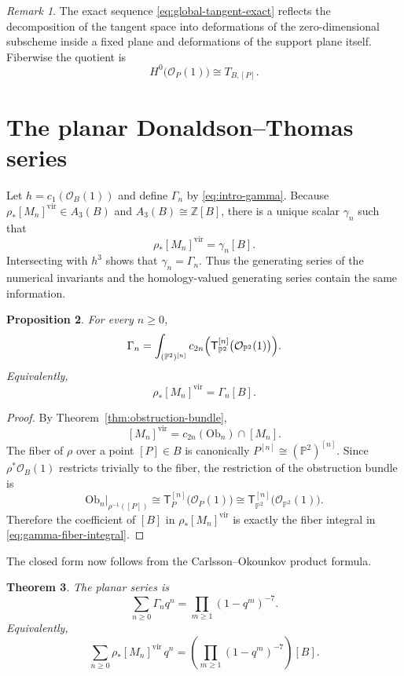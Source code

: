 \documentclass[12pt]{amsart}
\numberwithin{equation}{section}
\newcommand{\PP}{\mathbb{P}}
\newcommand{\Z}{\mathbb{Z}}
\newcommand{\OO}{\mathcal{O}}
\newcommand{\Ttw}{\mathsf{T}}
\newcommand{\vfc}[1]{[#1]^{\mathrm{vir}}}
\theoremstyle{plain}
\newtheorem{theorem}{Theorem}[section]
\newtheorem{proposition}[theorem]{Proposition}
\theoremstyle{definition}
\theoremstyle{remark}
\newtheorem{remark}[theorem]{Remark}
\begin{document}
\begin{remark}\label{rem:tbundle}
The exact sequence \eqref{eq:global-tangent-exact} reflects the decomposition of the tangent space into deformations of the zero-dimensional subscheme inside a fixed plane and deformations of the support plane itself.
Fiberwise the quotient is
\[
H^0\bigl(\OO_P(1)\bigr)\cong T_{B,[P]}.
\]
\end{remark}

\section{The planar Donaldson--Thomas series}\label{sec:series}

Let $h=c_1(\OO_B(1))$ and define $\Gamma_n$ by \eqref{eq:intro-gamma}.
Because $\rho_*\vfc{M_n}\in A_3(B)$ and $A_3(B)\cong \Z[B]$, there is a unique scalar $\gamma_n$ such that
\[
\rho_*\vfc{M_n}=\gamma_n[B].
\]
Intersecting with $h^3$ shows that $\gamma_n=\Gamma_n$.
Thus the generating series of the numerical invariants and the homology-valued generating series contain the same information.

\begin{proposition}\label{prop:fiber-integral}
For every $n\ge 0$,
\begin{equation}\label{eq:gamma-fiber-integral}
\Gamma_n=\int_{(\PP^2)^{[n]}} c_{2n}\Bigl(\Ttw_{\PP^2}^{[n]}\bigl(\OO_{\PP^2}(1)\bigr)\Bigr).
\end{equation}
Equivalently,
\[
\rho_*\vfc{M_n}=\Gamma_n[B].
\]
\end{proposition}

\begin{proof}
By Theorem~\ref{thm:obstruction-bundle},
\[
\vfc{M_n}=c_{2n}(\mathrm{Ob}_n)\cap [M_n].
\]
The fiber of $\rho$ over a point $[P]\in B$ is canonically $P^{[n]}\cong (\PP^2)^{[n]}$.
Since $\rho^*\OO_B(1)$ restricts trivially to the fiber, the restriction of the obstruction bundle is
\[
\mathrm{Ob}_n|_{\rho^{-1}([P])}
\cong
\Ttw_{P}^{[n]}\bigl(\OO_P(1)\bigr)
\cong
\Ttw_{\PP^2}^{[n]}\bigl(\OO_{\PP^2}(1)\bigr).
\]
Therefore the coefficient of $[B]$ in $\rho_*\vfc{M_n}$ is exactly the fiber integral in \eqref{eq:gamma-fiber-integral}.
\end{proof}

The closed form now follows from the Carlsson--Okounkov product formula.

\begin{theorem}\label{thm:planar-series}
The planar series is
\[
\sum_{n\ge 0}\Gamma_nq^n=\prod_{m\ge 1}(1-q^m)^{-7}.
\]
Equivalently,
\[
\sum_{n\ge 0}\rho_*\vfc{M_n}\,q^n
=
\left(\prod_{m\ge 1}(1-q^m)^{-7}\right)[B].
\]
\end{theorem}
\end{document}
